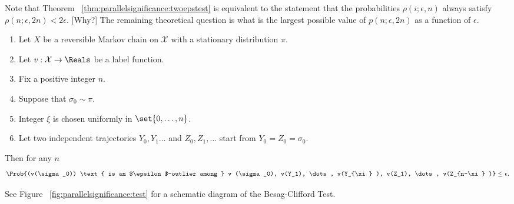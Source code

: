 \documentclass[12pt]{article}
\begin{document}
\begin{remark}
    Note that Theorem~%
    \ref{thm:parallelsignificance:twoepstest} is equivalent to the statement that the
    probabilities \( \rho(i; \epsilon, n) \) always satisfy \( \rho(n;
    \epsilon, 2n) < 2\epsilon \). [Why?]  The remaining theoretical question is
    what is the largest possible value of \( p(n; \epsilon, 2n) \) as a
    function of \( \epsilon \).
\end{remark}

\begin{theorem}
    \label{thm:parallelsignificance:bc1}
    \begin{enumerate}
        \item
            Let \( X \) be a reversible Markov chain on \( \mathcal{X} \)
            with a stationary distribution \( \pi \).
        \item
            Let \( v :  \mathcal{X} \to \Reals \) be a label function.
        \item
            Fix a positive integer \( n \).
        \item
            Suppose that \( \sigma_0 \sim \pi \).
        \item
            Integer \( \xi \) is chosen uniformly in \( \set{0,\dots, n}
            \).
        \item
            Let two independent trajectories \( Y_0 , Y_1 \dots \) and \(
            Z_0, Z_1, \dots \) start from \( Y_0 = Z_0 = \sigma_0 \).
    \end{enumerate}
    Then for any \( n \)
    \[
        \Prob{(v(\sigma_0)) \text{ is an $\epsilon$-outlier among } v
        (\sigma_0), v(Y_1), \dots, v(Y_{\xi} ), v(Z_1), \dots, v(Z_{n-\xi}
        )} \le \epsilon.
    \]
\end{theorem}

\begin{remark}
    See Figure~%
    \ref{fig:parallelsignificance:test} for a schematic diagram of the
    Besag-Clifford Test.
\end{remark}
\end{document}
